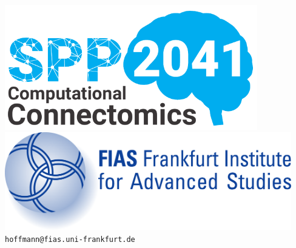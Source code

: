 \documentclass[a0,landscape]{a0poster}
\begin{document}
\begin{minipage}[b]{0.25\linewidth}
  \centering
  
  \vspace{-9cm}
  
  \includegraphics[width=11cm]{spp2041_logo.pdf}
  \hspace{2.2cm}
  \includegraphics[width=12.5cm]{FIAS-logo.pdf}\\

  \vspace{2cm}
  \Large \texttt{hoffmann@fias.uni-frankfurt.de}\\
  \vspace{3cm}
\end{minipage}
\vspace{-1.5cm} %


\begin{multicols}{3} %
  
  
  
  

  
  \printbibliography  

\end{multicols}



\end{document}

